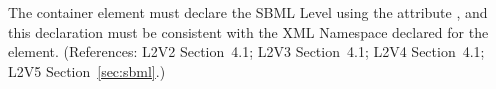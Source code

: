 The  container element must declare the SBML Level
using the attribute , and this declaration must be
consistent with the XML Namespace declared for the 
element.  (References: L2V2 Section~4.1; L2V3 Section~4.1; L2V4 Section~4.1; L2V5 Section~\ref{sec:sbml}.)

